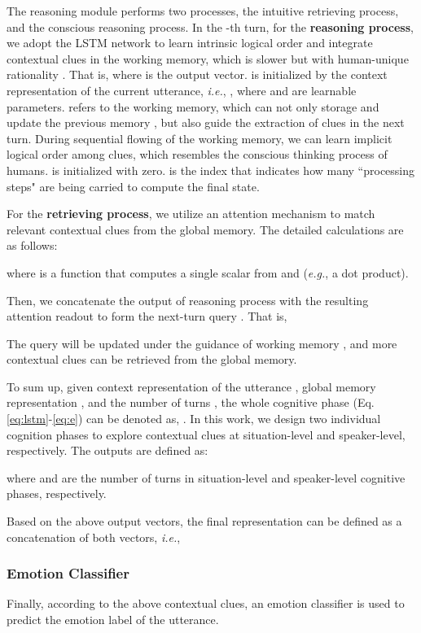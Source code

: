 \documentclass[11pt,a4paper]{article}
\begin{document}
The reasoning module performs two processes, the intuitive retrieving process, and the conscious reasoning process. In the -th turn, for the \textbf{reasoning process}, we adopt the LSTM network to learn intrinsic logical order and integrate contextual clues in the working memory, which is slower but with human-unique rationality \cite{baddeley1992working}.
That is,  
where  is the output vector.  is initialized by the context representation  of the current utterance,
\textit{i.e.}, ,
where  and  are learnable parameters.
 refers to the working memory, which
can not only storage and update the previous memory , but also guide the extraction of clues in the next turn.
During sequential flowing of the working memory, we can learn implicit logical order among clues, which resembles the conscious thinking process of humans.
 is initialized with zero.
 is the index that indicates how many ``processing steps" are being carried to compute the final state.

For the \textbf{retrieving process}, we utilize an attention mechanism to match relevant contextual clues from the global memory.
The detailed calculations are as follows:

where  is a function that computes a single scalar from  and   ({\it e.g.}, a dot product). 

Then, we concatenate the output of reasoning process  with the resulting attention readout  to form the next-turn query . That is,

The query  will be updated under the guidance of working memory , and more contextual clues can be retrieved from the global memory.

To sum up, given context representation  of the utterance , global memory representation , and the number of turns , the whole cognitive phase (Eq.\ref{eq:lstm}-\ref{eq:e}) can be denoted as, .
In this work, we design two individual cognition phases to explore contextual clues at situation-level and speaker-level, respectively. The outputs are defined as:

where  and  are the number of turns in situation-level and speaker-level cognitive phases, respectively. 

Based on the above output vectors, the final representation  can be defined as a concatenation of both vectors, \textit{i.e.},




\subsubsection{Emotion Classifier} \label{sec:emo}
Finally, according to the above contextual clues, an emotion classifier is used to predict the emotion label of the utterance.
 
\end{document}
